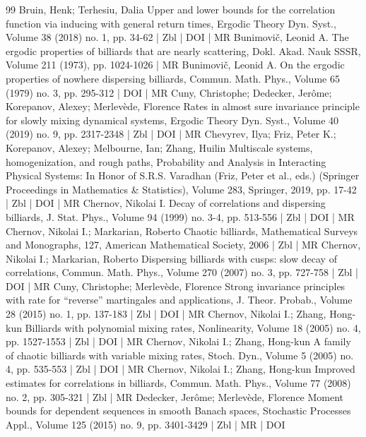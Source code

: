\documentclass[10pt]{amsart}
\theoremstyle{definition}\newtheorem{defi}[theo]{Definition}\newtheorem{rema}[theo]{Remark}\newtheorem{exam}[theo]{Example}\newtheorem{exem}[theo]{Example}\newtheorem{nota}[theo]{Notation}
\begin{document}
\begin{thebibliography}{99}
Bruin, Henk; Terhesiu, Dalia Upper and lower bounds for the correlation function via inducing with general return times, Ergodic Theory Dyn. Syst., Volume 38 (2018) no. 1, pp. 34-62 | Zbl | DOI | MR
Bunimovič, Leonid A. The ergodic properties of billiards that are nearly scattering, Dokl. Akad. Nauk SSSR, Volume 211 (1973), pp. 1024-1026 | MR
Bunimovič, Leonid A. On the ergodic properties of nowhere dispersing billiards, Commun. Math. Phys., Volume 65 (1979) no. 3, pp. 295-312 | DOI | MR
Cuny, Christophe; Dedecker, Jerôme; Korepanov, Alexey; Merlevède, Florence Rates in almost sure invariance principle for slowly mixing dynamical systems, Ergodic Theory Dyn. Syst., Volume 40 (2019) no. 9, pp. 2317-2348 | Zbl | DOI | MR
Chevyrev, Ilya; Friz, Peter K.; Korepanov, Alexey; Melbourne, Ian; Zhang, Huilin Multiscale systems, homogenization, and rough paths, Probability and Analysis in Interacting Physical Systems: In Honor of S.R.S. Varadhan (Friz, Peter et al., eds.) (Springer Proceedings in Mathematics \& Statistics), Volume 283, Springer, 2019, pp. 17-42 | Zbl | DOI | MR
Chernov, Nikolai I. Decay of correlations and dispersing billiards, J. Stat. Phys., Volume 94 (1999) no. 3-4, pp. 513-556 | Zbl | DOI | MR
Chernov, Nikolai I.; Markarian, Roberto Chaotic billiards, Mathematical Surveys and Monographs, 127, American Mathematical Society, 2006 | Zbl | MR
Chernov, Nikolai I.; Markarian, Roberto Dispersing billiards with cusps: slow decay of correlations, Commun. Math. Phys., Volume 270 (2007) no. 3, pp. 727-758 | Zbl | DOI | MR
Cuny, Christophe; Merlevède, Florence Strong invariance principles with rate for “reverse” martingales and applications, J. Theor. Probab., Volume 28 (2015) no. 1, pp. 137-183 | Zbl | DOI | MR
Chernov, Nikolai I.; Zhang, Hong-kun Billiards with polynomial mixing rates, Nonlinearity, Volume 18 (2005) no. 4, pp. 1527-1553 | Zbl | DOI | MR
Chernov, Nikolai I.; Zhang, Hong-kun A family of chaotic billiards with variable mixing rates, Stoch. Dyn., Volume 5 (2005) no. 4, pp. 535-553 | Zbl | DOI | MR
Chernov, Nikolai I.; Zhang, Hong-kun Improved estimates for correlations in billiards, Commun. Math. Phys., Volume 77 (2008) no. 2, pp. 305-321 | Zbl | MR
Dedecker, Jerôme; Merlevède, Florence Moment bounds for dependent sequences in smooth Banach spaces, Stochastic Processes Appl., Volume 125 (2015) no. 9, pp. 3401-3429 | Zbl | MR | DOI

\end{thebibliography}
\end{document}
